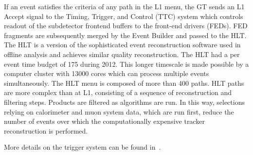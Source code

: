 If an event satisfies the criteria of any path in the L1 menu, the GT sends an
L1 Accept signal to the Timing, Trigger, and Control (TTC) system which controls
readout of the subdetector frontend buffers to the front-end drivers (FEDs). FED
fragments are subsequently merged by the Event Builder and passed to the HLT.
The HLT is a version of the sophisticated event reconstruction software used in
offline analysis and achieves similar quality reconstruction. The HLT had a per
event time budget of \SI{175}{\sec} during 2012. This longer timescale is made
possible by a computer cluster with \num{13000} cores which can process multiple
events simultaneously. The HLT menu is composed of more than \num{400} paths.
HLT paths are more complex than at L1, consisting of a sequence of
reconstruction and filtering steps. Products are filtered as algorithms are run.
In this way, selections relying on calorimeter and muon system data, which are
run first, reduce the number of events over which the computationally expensive
tracker reconstruction is performed.

More details on the trigger system can be found
in~\cite{1748-0221-12-01-P01020}.

